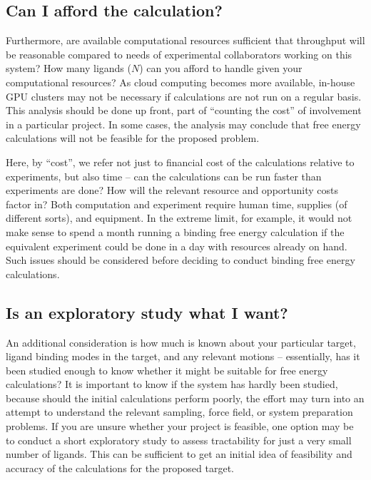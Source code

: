 \documentclass[9pt,bestpractices]{livecoms}
\begin{document}
\subsection{Can I afford the calculation?}
Furthermore, are available computational resources sufficient that throughput will be
reasonable compared to needs of experimental collaborators working on
this system? How many ligands ($N$) can you afford to handle given
your computational resources? As cloud computing becomes more available, in-house GPU clusters may not be necessary if calculations are not run on a regular basis.
This analysis should be done up front, part of ``counting the cost''
of involvement in a particular project. In some cases, the analysis may conclude that free energy calculations will not be feasible for the proposed problem.

Here, by ``cost'', we refer not just to financial cost of the calculations relative to experiments, but also time -- can the calculations can be run faster than experiments are done? How will the relevant resource and opportunity costs factor in? Both computation and experiment require human time, supplies (of different sorts), and equipment. In the extreme limit, for example, it would not make sense to spend a month running a binding free energy calculation if the equivalent experiment could be done in a day with resources already on hand. Such issues should be considered before deciding to conduct binding free energy calculations.
%
\subsection{Is an exploratory study what I want?}
An additional consideration is how much is known about your particular
target, ligand binding modes in the target, and any relevant motions
-- essentially, has it been studied enough to know whether it might be
suitable for free energy calculations? It is important to know if the system has hardly been studied, because should the initial calculations perform poorly, the effort may turn into an attempt to understand the relevant sampling, force field, or system preparation problems.
%
If you are unsure whether your project is feasible, one option may be
to conduct a short exploratory study to assess tractability for just a very small
number of ligands. This can be sufficient to get an initial
idea of feasibility and accuracy of the calculations for the
proposed target.
\end{document}
